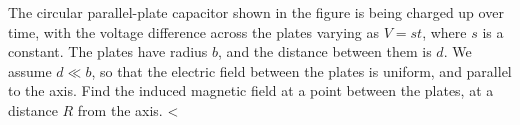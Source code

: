         The circular parallel-plate capacitor shown in the figure is being charged
        up over time, with the voltage difference across the plates varying as
        $V=st$, where $s$ is a constant. The plates have radius $b$, and the distance
        between them is $d$. We assume $d \ll b$, so that the electric field between
        the plates is uniform, and parallel to the axis. Find the induced magnetic
        field at a point between the plates, at a distance $R$ from the axis.
        <%
